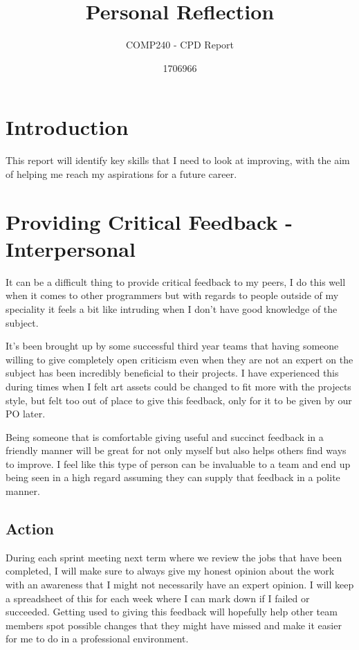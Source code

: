 \documentclass{scrartcl}
\title{Personal Reflection}
\subtitle{COMP240 - CPD Report}
\author{1706966}
\begin{document}
\maketitle

\section{Introduction}
This report will identify key skills that I need to look at improving, with the aim of helping me reach my aspirations for a future career.

\section{Providing Critical Feedback - Interpersonal}
It can be a difficult thing to provide critical feedback to my peers, I do this well when it comes to other programmers but with regards to people outside of my speciality it feels a bit like intruding when I don't have good knowledge of the subject. 

It's been brought up by some successful third year teams that having someone willing to give completely open criticism even when they are not an expert on the subject has been incredibly beneficial to their projects. I have experienced this during times when I felt art assets could be changed to fit more with the projects style, but felt too out of place to give this feedback, only for it to be given by our PO later. 

Being someone that is comfortable giving useful and succinct feedback in a friendly manner will be great for not only myself but also helps others find ways to improve. I feel like this type of person can be invaluable to a team and end up being seen in a high regard assuming they can supply that feedback in a polite manner.
\subsection{Action}
During each sprint meeting next term where we review the jobs that have been completed, I will make sure to always give my honest opinion about the work with an awareness that I might not necessarily have an expert opinion. I will keep a spreadsheet of this for each week where I can mark down if I failed or succeeded. Getting used to giving this feedback will hopefully help other team members spot possible changes that they might have missed and make it easier for me to do in a professional environment.
\end{document}

